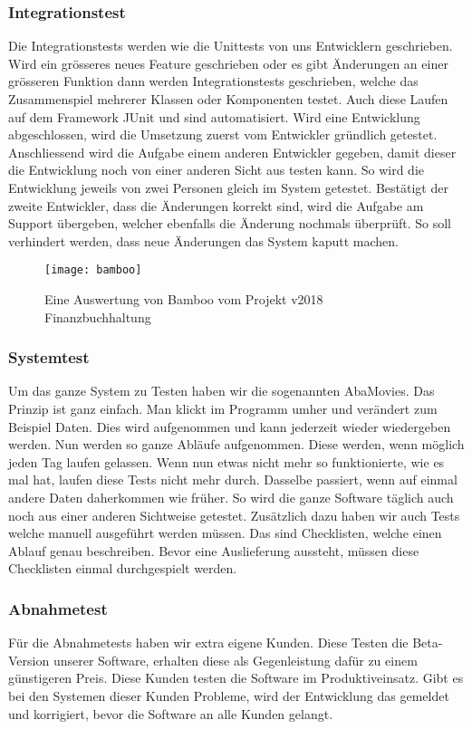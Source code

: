 \subsubsection{Integrationstest}
Die Integrationstests werden wie die Unittests von uns Entwicklern geschrieben. Wird ein grösseres neues Feature geschrieben oder es gibt Änderungen an einer grösseren Funktion dann werden Integrationstests geschrieben, welche das Zusammenspiel mehrerer Klassen oder Komponenten testet. Auch diese Laufen auf dem Framework JUnit und sind automatisiert. Wird eine Entwicklung abgeschlossen, wird die Umsetzung zuerst vom Entwickler gründlich getestet. Anschliessend wird die Aufgabe einem anderen Entwickler gegeben, damit dieser die Entwicklung noch von einer anderen Sicht aus testen kann. So wird die Entwicklung jeweils von zwei Personen gleich im System getestet. Bestätigt der zweite Entwickler, dass die Änderungen korrekt sind, wird die Aufgabe am Support übergeben, welcher ebenfalls die Änderung nochmals überprüft. So soll verhindert werden, dass neue Änderungen das System kaputt machen. 
\begin{figure}[H]
	\centering
	\texttt{[image: bamboo]}
	\caption{Eine Auswertung von Bamboo vom Projekt v2018 Finanzbuchhaltung}
\end{figure}
\subsubsection{Systemtest}
Um das ganze System zu Testen haben wir die sogenannten AbaMovies. Das Prinzip ist ganz einfach. Man klickt im Programm umher und verändert zum Beispiel Daten. Dies wird aufgenommen und kann jederzeit wieder wiedergeben werden. Nun werden so ganze Abläufe aufgenommen. Diese werden, wenn möglich jeden Tag laufen gelassen. Wenn nun etwas nicht mehr so funktionierte, wie es mal hat, laufen diese Tests nicht mehr durch. Dasselbe passiert, wenn auf einmal andere Daten daherkommen wie früher. So wird die ganze Software täglich auch noch aus einer anderen Sichtweise getestet. Zusätzlich dazu haben wir auch Tests welche manuell ausgeführt werden müssen. Das sind Checklisten, welche einen Ablauf genau beschreiben. Bevor eine Auslieferung aussteht, müssen diese Checklisten einmal durchgespielt werden.
\subsubsection{Abnahmetest}
Für die Abnahmetests haben wir extra eigene Kunden. Diese Testen die Beta-Version unserer Software, erhalten diese als Gegenleistung dafür zu einem günstigeren Preis. Diese Kunden testen die Software im Produktiveinsatz. Gibt es bei den Systemen dieser Kunden Probleme, wird der Entwicklung das gemeldet und korrigiert, bevor die Software an alle Kunden gelangt.

